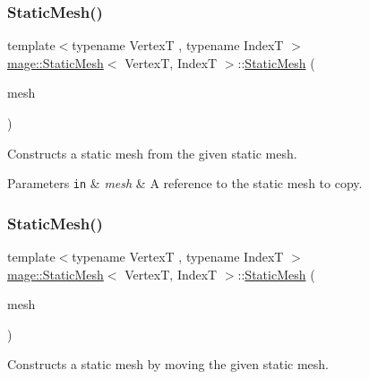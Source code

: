 \subsubsection{\texorpdfstring{Static\+Mesh()}{StaticMesh()}\hspace{0.1cm}{\footnotesize\ttfamily [3/4]}}
{\footnotesize\ttfamily template$<$typename VertexT , typename IndexT $>$ \\
\hyperlink{classmage_1_1_static_mesh}{mage\+::\+Static\+Mesh}$<$ VertexT, IndexT $>$\+::\hyperlink{classmage_1_1_static_mesh}{Static\+Mesh} (\begin{DoxyParamCaption}\item[{const \hyperlink{classmage_1_1_static_mesh}{Static\+Mesh}$<$ VertexT, IndexT $>$ \&}]{mesh }\end{DoxyParamCaption})\hspace{0.3cm}{\ttfamily [delete]}}

Constructs a static mesh from the given static mesh.


\begin{DoxyParams}[1]{Parameters}
\mbox{\tt in}  & {\em mesh} & A reference to the static mesh to copy. \\
\hline
\end{DoxyParams}
\hypertarget{classmage_1_1_static_mesh_ae8d097727f50c05d0397828540b1af0c}{}\label{classmage_1_1_static_mesh_ae8d097727f50c05d0397828540b1af0c} 
\subsubsection{\texorpdfstring{Static\+Mesh()}{StaticMesh()}\hspace{0.1cm}{\footnotesize\ttfamily [4/4]}}
{\footnotesize\ttfamily template$<$typename VertexT , typename IndexT $>$ \\
\hyperlink{classmage_1_1_static_mesh}{mage\+::\+Static\+Mesh}$<$ VertexT, IndexT $>$\+::\hyperlink{classmage_1_1_static_mesh}{Static\+Mesh} (\begin{DoxyParamCaption}\item[{\hyperlink{classmage_1_1_static_mesh}{Static\+Mesh}$<$ VertexT, IndexT $>$ \&\&}]{mesh }\end{DoxyParamCaption})\hspace{0.3cm}{\ttfamily [noexcept]}}

Constructs a static mesh by moving the given static mesh.



